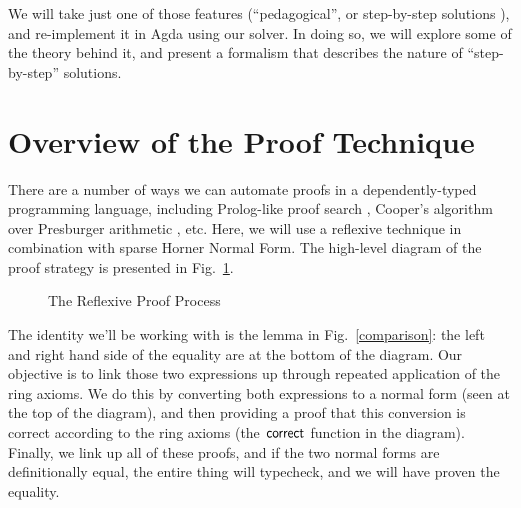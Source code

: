 \documentclass[acmsmall,review,anonymous]{acmart}\settopmatter{printfolios=true,printccs=false,printacmref=false}
\begin{document}
\begin{description}
    We will take just one of those features (``pedagogical'', or step-by-step
    solutions \cite{the_development_team_step-by-step_2009}), and re-implement
    it in Agda using our solver. In doing so, we will explore some of the theory
    behind it, and present a formalism that describes the nature of
    ``step-by-step'' solutions.
\end{description}

\section{Overview of the Proof Technique}
There are a number of ways we can automate proofs in a dependently-typed
programming language, including Prolog-like proof search \cite{kokke_auto_2015},
Cooper's algorithm over Presburger arithmetic \cite{allais_deciding_2011}, etc.
Here, we will use a reflexive technique \cite{boutin_using_1997} in combination
with sparse Horner Normal Form. The high-level diagram of the proof strategy is
presented in Fig.~\ref{proof-process}.

\begin{figure}
  \vspace*{-50pt}
  \caption{The Reflexive Proof Process}
  \label{proof-process}
\end{figure}

The identity we'll be working with is the lemma in Fig.~\ref{comparison}: the
left and right hand side of the equality are at the bottom of the diagram. Our
objective is to link those two expressions up through repeated application of
the ring axioms. We do this by converting both expressions to a normal form
(seen at the top of the diagram), and then providing a proof that this
conversion is correct according to the ring axioms (the
\(\AgdaFunction{correct}\) function in the diagram). Finally, we link up all of
these proofs, and if the two normal forms are definitionally equal, the entire
thing will typecheck, and we will have proven the equality.
\end{document}
